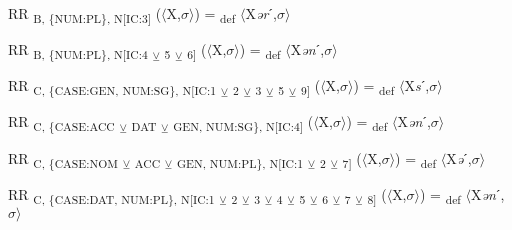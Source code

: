 {\begin{exe}
 RR \textsubscript{B, \{NUM:PL\}, N[IC:3]} ($\langle$X,$\sigma $$\rangle$) = \textsubscript{def} $\langle$X\textit{ər}ˊ,$\sigma $$\rangle$
\end{exe}

\begin{exe}
 RR \textsubscript{B, \{NUM:PL\}, N[IC:4} \textsubscript{${\veebar}$}\textsubscript{ 5} \textsubscript{${\veebar}$}\textsubscript{ 6]} ($\langle$X,$\sigma $$\rangle$) = \textsubscript{def} $\langle$X\textit{ən}ˊ,$\sigma $$\rangle$
\end{exe}

\begin{exe}
 RR \textsubscript{C, \{CASE:GEN, NUM:SG\}, N[IC:1} \textsubscript{${\veebar}$}\textsubscript{ 2} \textsubscript{${\veebar}$}\textsubscript{ 3} \textsubscript{${\veebar}$}\textsubscript{ 5} \textsubscript{${\veebar}$}\textsubscript{ 9]} ($\langle$X,$\sigma $$\rangle$) = \textsubscript{def} $\langle$X\textit{s}ˊ,$\sigma $$\rangle$
\end{exe}

\begin{exe}
 RR \textsubscript{C, \{CASE:ACC} \textsubscript{${\veebar}$}\textsubscript{ DAT} \textsubscript{${\veebar}$}\textsubscript{ GEN, NUM:SG\}, N[IC:4]} ($\langle$X,$\sigma $$\rangle$) = \textsubscript{def} $\langle$X\textit{ən}ˊ,$\sigma $$\rangle$
\end{exe}

\begin{exe}
 RR \textsubscript{C, \{CASE:NOM} \textsubscript{${\veebar}$}\textsubscript{ ACC} \textsubscript{${\veebar}$}\textsubscript{ GEN, NUM:PL\}, N[IC:1} \textsubscript{${\veebar}$}\textsubscript{ 2} \textsubscript{${\veebar}$}\textsubscript{ 7]} ($\langle$X,$\sigma $$\rangle$) = \textsubscript{def} $\langle$X\textit{ə}ˊ,$\sigma $$\rangle$
\end{exe}

\begin{exe}
 RR \textsubscript{C, \{CASE:DAT, NUM:PL\}, N[IC:1} \textsubscript{${\veebar}$}\textsubscript{ 2} \textsubscript{${\veebar}$}\textsubscript{ 3} \textsubscript{${\veebar}$}\textsubscript{ 4} \textsubscript{${\veebar}$}\textsubscript{ 5} \textsubscript{${\veebar}$}\textsubscript{ 6} \textsubscript{${\veebar}$}\textsubscript{ 7} \textsubscript{${\veebar}$}\textsubscript{ 8]} ($\langle$X,$\sigma $$\rangle$) = \textsubscript{def} $\langle$X\textit{ən}ˊ,$\sigma $$\rangle$
\end{exe}

}
